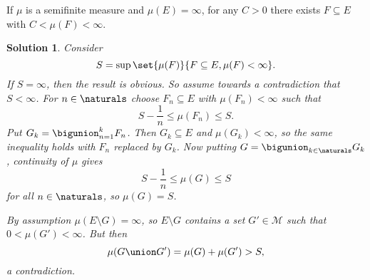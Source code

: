 \documentclass[article, a4paper, 11pt, oneside]{memoir}
\numberwithin{equation}{chapter}
\newcommand{\calM}{\mathcal{M}}
\theoremstyle{nonumberplain}
\newtheorem{solution}{Solution}
\begin{document}
\begin{exerciseframed*}[14]
    If $\mu$ is a semifinite measure and $\mu(E) = \infty$, for any $C > 0$ there exists $F \subseteq E$ with $C < \mu(F) < \infty$.
\end{exerciseframed*}

\begin{solution}
	Consider
	\begin{equation*}
		S = \sup \set{ \mu(F) }{ F \subseteq E, \mu(F) < \infty }.
	\end{equation*}
	If $S = \infty$, then the result is obvious. So assume towards a contradiction that $S < \infty$. For $n \in \naturals$ choose $F_n \subseteq E$ with $\mu(F_n) < \infty$ such that
	\begin{equation*}
		S - \frac{1}{n} \leq \mu(F_n) \leq S.
	\end{equation*}
	Put $G_k = \bigunion_{n=1}^k F_n$. Then $G_k \subseteq E$ and $\mu(G_k) < \infty$, so the same inequality holds with $F_n$ replaced by $G_k$. Now putting $G = \bigunion_{k \in \naturals} G_k$, continuity of $\mu$ gives
	\begin{equation*}
		S - \frac{1}{n} \leq \mu(G) \leq S
	\end{equation*}
	for all $n \in \naturals$, so $\mu(G) = S$.
	
	By assumption $\mu(E \setminus G) = \infty$, so $E \setminus G$ contains a set $G' \in \calM$ such that $0 < \mu(G') < \infty$. But then
	\begin{equation*}
		\mu(G \union G') = \mu(G) + \mu(G') > S,
	\end{equation*}
	a contradiction.
\end{solution}
\end{document}
